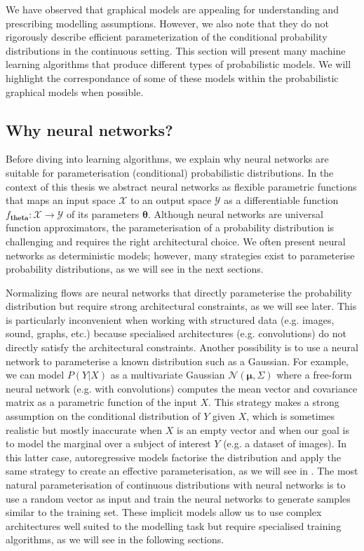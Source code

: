 We have observed that graphical models are appealing for understanding and prescribing modelling assumptions. However, we also note that they do not rigorously describe efficient parameterization of the conditional probability distributions in the continuous setting. This section will present many machine learning algorithms that produce different types of probabilistic models. We will highlight the correspondance of some of these models within the probabilistic graphical models when possible.
\subsection{Why neural networks?}
Before diving into learning algorithms, we explain why neural networks are suitable for parameterisation (conditional) probabilistic distributions. In the context of this thesis we abstract neural networks as flexible parametric functions that maps an input space $\mathcal{X}$ to an output space $\mathcal{Y}$ as a differentiable function $f_{\bm{theta}}: \mathcal{X} \rightarrow \mathcal{Y}$ of its parameters $\bm{\theta}$. Although neural networks are universal function approximators, the parameterisation of a probability distribution is challenging and requires the right architectural choice. We often present neural networks as deterministic models; however, many strategies exist to parameterise probability distributions, as we will see in the next sections.

Normalizing flows are neural networks that directly parameterise the probability distribution but require strong architectural constraints, as we will see later. This is particularly inconvenient when working with structured data (e.g. images, sound, graphs, etc.) because specialised architectures (e.g. convolutions) do not directly satisfy the architectural constraints. Another possibility is to use a neural network to parameterise a known distribution such as a Gaussian. For example, we can model $P(Y|X)$ as a multivariate Gaussian $\mathcal{N}(\bm{\mu}, \Sigma)$ where a free-form neural network (e.g. with convolutions) computes the mean vector and covariance matrix as a parametric function of the input $X$. This strategy makes a strong assumption on the conditional distribution of $Y$ given $X$, which is sometimes realistic but mostly inaccurate when $X$ is an empty vector and when our goal is to model the marginal over a subject of interest $Y$ (e.g. a dataset of images). In this latter case, autoregressive models factorise the distribution and apply the same strategy to create an effective parameterisation, as we will see in . The most natural parameterisation of continuous distributions with neural networks is to use a random vector as input and train the neural networks to generate samples similar to the training set. These implicit models allow us to use complex architectures well suited to the modelling task but require specialised training algorithms, as we will see in the following sections.

